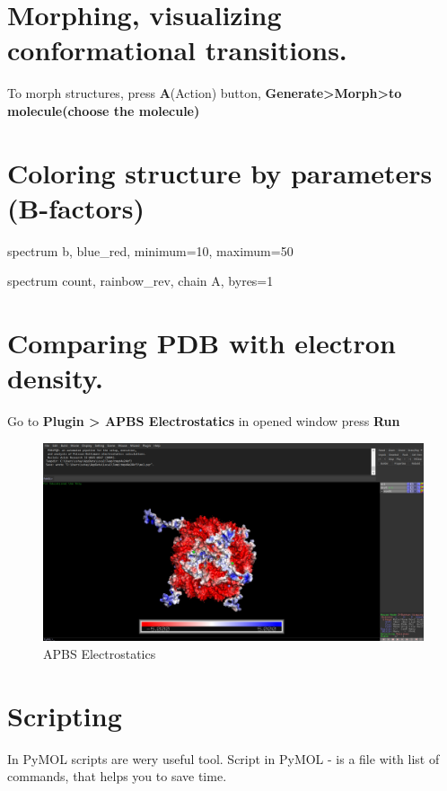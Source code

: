 \documentclass{article}
\begin{document}
\section{Morphing, visualizing conformational transitions.}

To morph structures, press {\Large \textbf{A}}(Action) button, \textbf{Generate>Morph>to molecule(choose the molecule)}








\section{Coloring structure by parameters (B-factors)}

spectrum b, blue\_red, minimum=10, maximum=50

spectrum count, rainbow\_rev, chain A, byres=1







\section{Comparing PDB with electron density.}

Go to \textbf{Plugin > APBS Electrostatics} in opened window press \textbf{Run}


\begin{figure}[H]
    \centering 
    \includegraphics[width=1\textwidth]{workshops/pymol/imgs/1kx5 Elcetrostatics.png}
    \caption{APBS Electrostatics}
    \label{fig:my_label}
\end{figure}








\section{Scripting}
In PyMOL scripts are wery useful tool. Script in PyMOL - is a file with list of commands, that helps you to save time.
\end{document}

